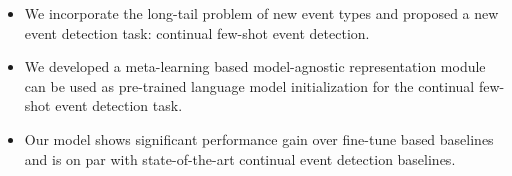 \begin{itemize}[noitemsep]
\item We incorporate the long-tail problem of new event types and proposed a new event detection task: continual few-shot event detection.

  \item We developed a meta-learning based model-agnostic representation module can be used as pre-trained language model initialization for the continual few-shot event detection task.
  \item Our model shows significant performance gain over fine-tune based baselines and is on par with state-of-the-art continual event detection baselines.
\end{itemize}
